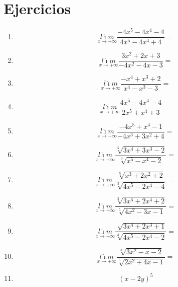 \documentclass[oneside,spanish,letter]{article}
\begin{document}
\section{Ejercicios}
\begin{enumerate}
 \item $$\underset{x\rightarrow +\infty}{l\acute{\imath}m} \frac{-4x^5-4x^4-4}{4x^5-4x^4+4}=$$
 \item $$\underset{x\rightarrow +\infty}{l\acute{\imath}m} \frac{3x^2+2x+3}{-4x^2-4x-3}=$$
 \item $$\underset{x\rightarrow +\infty}{l\acute{\imath}m} \frac{-x^4+x^3+2}{x^4-x^3-3}=$$
 \item $$\underset{x\rightarrow +\infty}{l\acute{\imath}m} \frac{4x^5-4x^4-4}{2x^5+x^4+3}=$$
 \item $$\underset{x\rightarrow +\infty}{l\acute{\imath}m} \frac{-4x^5+x^4-1}{-4x^3+3x^2+4}=$$
 \item $$\underset{x\rightarrow +\infty}{l\acute{\imath}m} \frac{\sqrt[5]{3x^4+3x^3-2}}{\sqrt[3]{x^5-x^4-2}}=$$
 \item $$\underset{x\rightarrow +\infty}{l\acute{\imath}m} \frac{\sqrt[5]{x^3+2x^2+2}}{\sqrt[3]{4x^5-2x^4-4}}=$$
 \item $$\underset{x\rightarrow +\infty}{l\acute{\imath}m} \frac{\sqrt[3]{3x^5+2x^4+2}}{\sqrt[5]{4x^2-3x-1}}=$$
 \item $$\underset{x\rightarrow +\infty}{l\acute{\imath}m} \frac{\sqrt[]{3x^4+2x^3+1}}{\sqrt[3]{4x^5-2x^4-2}}=$$
 \item $$\underset{x\rightarrow +\infty}{l\acute{\imath}m} \frac{\sqrt[3]{3x^2-x-2}}{\sqrt[5]{2x^2+4x-1}}=$$
\item $$(x-2y)^5$$
 \end{enumerate}
  \newpage
\end{document}
